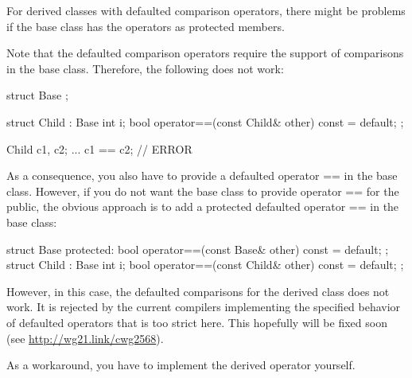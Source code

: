 For derived classes with defaulted comparison operators, there might be problems if the base class has the operators as protected members.

Note that the defaulted comparison operators require the support of comparisons in the base class. Therefore, the following does not work:

\begin{cpp}
struct Base {
};

struct Child : Base {
	int i;
	bool operator==(const Child& other) const = default;
};

Child c1, c2;
...
c1 == c2; // ERROR
\end{cpp}

As a consequence, you also have to provide a defaulted operator == in the base class. However, if you do not want the base class to provide operator == for the public, the obvious approach is to add a protected defaulted operator == in the base class:

\begin{cpp}
struct Base {
	protected:
	bool operator==(const Base& other) const = default;
};
struct 
Child : Base {
	int i;
	bool operator==(const Child& other) const = default;
};
\end{cpp}

However, in this case, the defaulted comparisons for the derived class does not work. It is rejected by the current compilers implementing the specified behavior of defaulted operators that is too strict here. This hopefully will be fixed soon (see \url{http://wg21.link/cwg2568}).

As a workaround, you have to implement the derived operator yourself.




